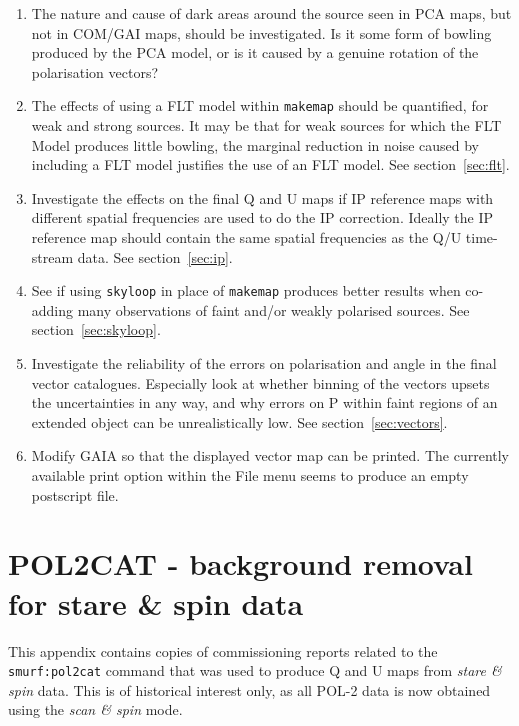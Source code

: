 \documentclass[twoside,11pt]{starlink}
\begin{document}
\begin{enumerate}
\item The nature and cause of dark areas around the source seen in PCA
maps, but not in COM/GAI maps, should be investigated. Is it some form of
bowling produced by the PCA model, or is it caused by a genuine rotation
of the polarisation vectors?

\item The effects of using a FLT model within \texttt{makemap} should be
quantified, for weak and strong sources. It may be that for weak sources
for which the FLT Model produces little bowling, the marginal reduction
in noise caused by including a FLT model justifies the use of an FLT model.
See section~\ref{sec:flt}.

\item Investigate the effects on the final Q and U maps if IP reference
maps with different spatial frequencies are used to do the IP correction.
Ideally the IP reference map should contain the same spatial frequencies
as the Q/U time-stream data. See section~\ref{sec:ip}.

\item See if using \texttt{skyloop} in place of \texttt{makemap} produces
better results when co-adding many observations of faint and/or weakly
polarised sources.  See section~\ref{sec:skyloop}.

\item Investigate the reliability of the errors on polarisation and angle
in the final vector catalogues. Especially look at whether binning of the
vectors upsets the uncertainties in any way, and why errors on P within faint
regions of an extended object can be unrealistically low. See
section~\ref{sec:vectors}.

\item Modify GAIA so that the displayed vector map can be printed. The
currently available print option within the File menu seems to produce an
empty postscript file.
\end{enumerate}

\appendix

\section{POL2CAT - background removal for stare \& spin data}
\label{app:stare}
This appendix contains copies of commissioning reports related to the
\texttt{smurf:pol2cat} command that was used to produce Q and U maps from
\emph{stare \& spin} data. This is of historical interest only, as all POL-2
data is now obtained using the \emph{scan \& spin} mode.
\end{document}
